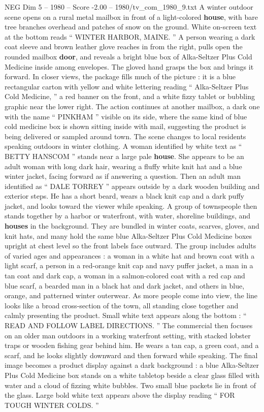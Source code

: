 \begin{textsample}{NEG Dim 5 – 1980 – Score -2.00 – 1980/tv\_com\_1980\_9.txt}  \label{ex:f5_neg_062}
A winter outdoor scene opens on a rural metal mailbox in front of a light-colored \textbf{house}, with bare tree branches overhead and patches of snow on the ground.
White on-screen text at the bottom reads “ WINTER HARBOR, MAINE. ” A person wearing a dark coat sleeve and brown leather glove reaches in from the right, pulls open the rounded mailbox \textbf{door}, and reveals a bright blue box of Alka-Seltzer Plus Cold Medicine inside among envelopes.
The gloved hand grasps the box and brings it forward.
In closer views, the package fills much of the picture : it is a blue rectangular carton with yellow and white lettering reading “ Alka-Seltzer Plus Cold Medicine, ” a red banner on the front, and a white fizzy tablet or bubbling graphic near the lower right.
The action continues at another mailbox, a dark one with the name “ PINKHAM ” visible on its side, where the same kind of blue cold medicine box is shown sitting inside with mail, suggesting the product is being delivered or sampled around town.
The scene changes to local residents speaking outdoors in winter clothing.
A woman identified by white text as “ BETTY HANSCOM ” stands near a large pale \textbf{house}.
She appears to be an adult woman with long dark hair, wearing a fluffy white knit hat and a blue winter jacket, facing forward as if answering a question.
Then an adult man identified as “ DALE TORREY ” appears outside by a dark wooden building and exterior steps.
He has a short beard, wears a black knit cap and a dark puffy jacket, and looks toward the viewer while speaking.
A group of townspeople then stands together by a harbor or waterfront, with water, shoreline buildings, and \textbf{houses} in the background.
They are bundled in winter coats, scarves, gloves, and knit hats, and many hold the same blue Alka-Seltzer Plus Cold Medicine boxes upright at chest level so the front labels face outward.
The group includes adults of varied ages and appearances : a woman in a white hat and brown coat with a light scarf, a person in a red-orange knit cap and navy puffer jacket, a man in a tan coat and dark cap, a woman in a salmon-colored coat with a red cap and blue scarf, a bearded man in a black hat and dark jacket, and others in blue, orange, and patterned winter outerwear.
As more people come into view, the line looks like a broad cross-section of the town, all standing close together and calmly presenting the product.
Small white text appears along the bottom : “ READ AND FOLLOW LABEL DIRECTIONS. ” The commercial then focuses on an older man outdoors in a working waterfront setting, with stacked lobster traps or wooden fishing gear behind him.
He wears a tan cap, a green coat, and a scarf, and he looks slightly downward and then forward while speaking.
The final image becomes a product display against a dark background : a blue Alka-Seltzer Plus Cold Medicine box stands on a white tabletop beside a clear glass filled with water and a cloud of fizzing white bubbles.
Two small blue packets lie in front of the glass.
Large bold white text appears above the display reading “ FOR TOUGH WINTER COLDS. ”

\end{textsample}
